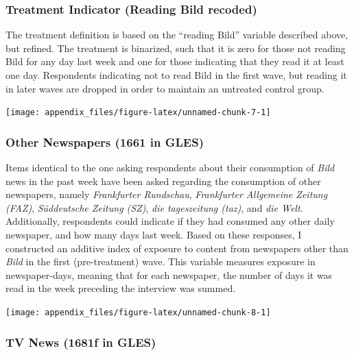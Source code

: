 \documentclass[
]{article}
\begin{document}
\hypertarget{treatment-indicator-reading-bild-recoded}{%
\subsubsection{Treatment Indicator (Reading Bild recoded)}\label{treatment-indicator-reading-bild-recoded}}

The treatment definition is based on the ``reading Bild'' variable described above, but refined. The treatment is binarized, such that it is zero for those not reading Bild for any day last week and one for those indicating that they read it at least one day. Respondents indicating not to read Bild in the first wave, but reading it in later waves are dropped in order to maintain an untreated control group.

\begin{center}\texttt{[image: appendix\_files/figure-latex/unnamed-chunk-7-1]} \end{center}

\hypertarget{other-newspapers-1661-in-gles}{%
\subsubsection{Other Newspapers (1661 in GLES)}\label{other-newspapers-1661-in-gles}}

Items identical to the one asking respondents about their consumption of \emph{Bild} news in the past week have been asked regarding the consumption of other newspapers, namely \emph{Frankfurter Rundschau}, \emph{Frankfurter Allgemeine Zeitung (FAZ)}, \emph{Süddeutsche Zeitung (SZ)}, \emph{die tageszeitung (taz)}, and \emph{die Welt}. Additionally, respondents could indicate if they had consumed any other daily newspaper, and how many days last week. Based on these responses, I constructed an additive index of exposure to content from newspapers other than \emph{Bild} in the first (pre-treatment) wave. This variable measures exposure in newspaper-days, meaning that for each newspaper, the number of days it was read in the week preceding the interview was summed.

\begin{center}\texttt{[image: appendix\_files/figure-latex/unnamed-chunk-8-1]} \end{center}

\hypertarget{tv-news-1681f-in-gles}{%
\subsubsection{TV News (1681f in GLES)}\label{tv-news-1681f-in-gles}}
\end{document}
